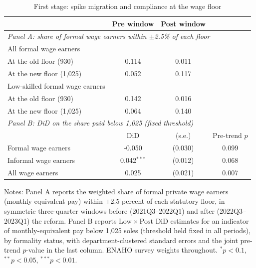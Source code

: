 \begin{table}[H]\centering
\caption{First stage: spike migration and compliance at the wage floor}\label{tab:firststage}
\begin{threeparttable}
\footnotesize
\begin{tabular}{lccc}
\toprule
  & Pre window & Post window & \\
\midrule
\multicolumn{4}{l}{\emph{Panel A: share of formal wage earners within $\pm$2.5\% of each floor}}\\
All formal wage earners & & & \\
\quad At the old floor (930) & 0.114 & 0.011 & \\
\quad At the new floor (1{,}025) & 0.052 & 0.117 & \\
Low-skilled formal wage earners & & & \\
\quad At the old floor (930) & 0.142 & 0.016 & \\
\quad At the new floor (1{,}025) & 0.064 & 0.140 & \\
\midrule
\multicolumn{4}{l}{\emph{Panel B: DiD on the share paid below 1{,}025 (fixed threshold)}}\\
 & DiD & (s.e.) & Pre-trend $p$ \\ \midrule
Formal wage earners & -0.050 & (0.030) & 0.099 \\
Informal wage earners & 0.042$^{***}$ & (0.012) & 0.068 \\
All wage earners & 0.025 & (0.021) & 0.007 \\
\bottomrule
\end{tabular}
\begin{tablenotes}\footnotesize
\item Notes: Panel A reports the weighted share of formal private wage earners (monthly-equivalent pay) within $\pm$2.5 percent of each statutory floor, in symmetric three-quarter windows before (2021Q3--2022Q1) and after (2022Q3--2023Q1) the reform. Panel B reports $\mathrm{Low}\times\mathrm{Post}$ DiD estimates for an indicator of monthly-equivalent pay below 1{,}025 soles (threshold held fixed in all periods), by formality status, with department-clustered standard errors and the joint pre-trend $p$-value in the last column. ENAHO survey weights throughout. $^{*}p<0.1$, $^{**}p<0.05$, $^{***}p<0.01$.
\end{tablenotes}
\end{threeparttable}\end{table}
